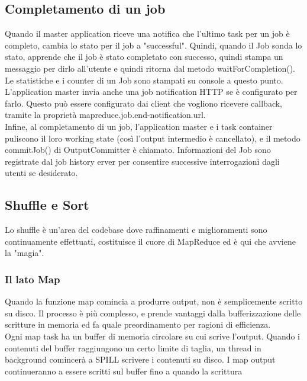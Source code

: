 \subsection{Completamento di un job}
Quando il master application riceve una notifica che l'ultimo task per un job è completo, cambia lo stato per il job a "successful". Quindi, quando il Job sonda lo stato, apprende che il job è stato completato con successo, quindi stampa un messaggio per dirlo all'utente e quindi ritorna dal metodo waitForCompletion(). Le statistiche e i counter di un Job sono stampati su console a questo punto. \\
L'application master invia anche una job notification HTTP se è configurato per farlo. Questo può essere configurato dai client che vogliono ricevere callback, tramite la proprietà mapreduce.job.end-notification.url. \\
Infine, al completamento di un job, l'application master e i task container puliscono il loro working state (così l'output intermedio è cancellato), e il metodo commitJob() di OutputCommitter è chiamato. Informazioni del Job sono registrate dal job history erver per consentire successive interrogazioni dagli utenti se desiderato.
\subsection{Shuffle e Sort}
Lo shuffle è un'area del codebase dove raffinamenti e miglioramenti sono continuamente effettuati, costituisce il cuore di MapReduce ed è qui che avviene la "magia".
\subsubsection{Il lato Map}
Quando la funzione map comincia a produrre output, non è semplicemente scritto su disco. Il processo è più complesso, e prende vantaggi dalla bufferizzazione delle scritture in memoria ed fa quale preordinamento per ragioni di efficienza. \\
Ogni map task ha un buffer di memoria circolare su cui scrive l'output. Quando i contenuti del buffer raggiungono un certo limite di taglia, un thread in background comincerà a SPILL scrivere i contenuti su disco. I map output continueranno a essere scritti sul buffer fino a quando la scrittura



















